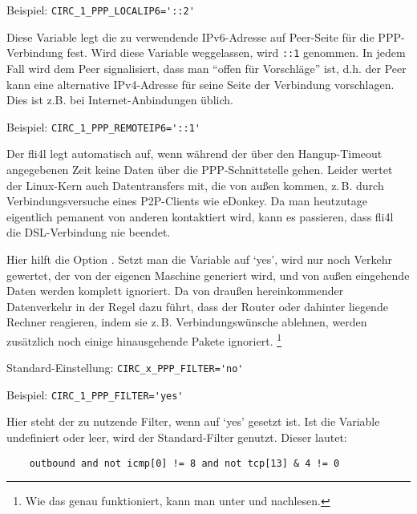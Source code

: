 \begin{description}
Beispiel: \verb+CIRC_1_PPP_LOCALIP6='::2'+


Diese Variable legt die zu verwendende IPv6-Adresse auf Peer-Seite für die
PPP-Verbindung fest. Wird diese Variable weggelassen, wird \verb+::1+ genommen.
In jedem Fall wird dem Peer signalisiert, dass man ``offen für Vorschläge''
ist, d.h. der Peer kann eine alternative IPv4-Adresse für seine Seite der
Verbindung vorschlagen. Dies ist z.B. bei Internet-Anbindungen üblich.

Beispiel: \verb+CIRC_1_PPP_REMOTEIP6='::1'+


Der fli4l legt automatisch auf, wenn während der über den Hangup-Timeout
angegebenen Zeit keine Daten über die PPP-Schnittstelle gehen.
Leider wertet der Linux-Kern auch Datentransfers mit, die von außen
kommen, z.\,B. durch Verbindungsversuche eines P2P-Clients wie
eDonkey. Da man heutzutage eigentlich pemanent von anderen kontaktiert
wird, kann es passieren, dass fli4l die DSL-Verbindung nie beendet.

Hier hilft die Option . Setzt man die Variable auf
`yes', wird nur noch Verkehr gewertet, der von der eigenen Maschine generiert
wird, und von außen eingehende Daten werden komplett ignoriert. Da von draußen
hereinkommender Datenverkehr in der Regel dazu führt, dass der Router oder
dahinter liegende Rechner reagieren, indem sie z.\,B. Verbindungswünsche
ablehnen, werden zusätzlich noch einige hinausgehende Pakete ignoriert.
\footnote{Wie das genau funktioniert, kann man unter
 und
nachlesen.}

Standard-Einstellung: \verb+CIRC_x_PPP_FILTER='no'+

Beispiel: \verb+CIRC_1_PPP_FILTER='yes'+


Hier steht der zu nutzende Filter, wenn  auf `yes'
gesetzt ist. Ist die Variable undefiniert oder leer, wird der Standard-Filter
genutzt. Dieser lautet:

\begin{example}
\begin{verbatim}
    outbound and not icmp[0] != 8 and not tcp[13] & 4 != 0
\end{verbatim}
\end{example}


\end{description}
